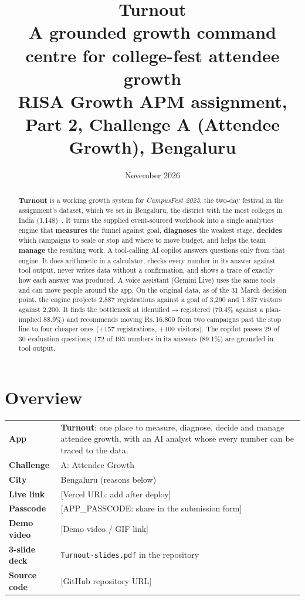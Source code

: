 \documentclass[11pt,a4paper]{article}
\title{\vspace{-1.2cm}\textbf{Turnout}\\[4pt]
\large A grounded growth command centre for college-fest attendee growth\\[2pt]
\normalsize RISA Growth APM assignment, Part 2, Challenge A (Attendee Growth), Bengaluru}
\author{\AuthorName}
\date{November 2026}
\newcommand{\LiveURL}{[Vercel URL: add after deploy]}
\newcommand{\Passcode}{[APP\_PASSCODE: share in the submission form]}
\newcommand{\RepoURL}{[GitHub repository URL]}
\newcommand{\VideoURL}{[Demo video / GIF link]}
\newcommand{\SlidesURL}{\texttt{Turnout-slides.pdf} in the repository}
\newcommand{\rs}{Rs.\,}
\begin{document}
\maketitle
\thispagestyle{fancy}

\begin{abstract}
\noindent \textbf{Turnout} is a working growth system for \emph{CampusFest 2025}, the two-day festival in the assignment's dataset, which we set in Bengaluru, the district with the most colleges in India (1,148)~\cite{aishe2024}. It turns the supplied event-sourced workbook into a single analytics engine that \textbf{measures} the funnel against goal, \textbf{diagnoses} the weakest stage, \textbf{decides} which campaigns to scale or stop and where to move budget, and helps the team \textbf{manage} the resulting work. A tool-calling AI copilot answers questions only from that engine. It does arithmetic in a calculator, checks every number in its answer against tool output, never writes data without a confirmation, and shows a trace of exactly how each answer was produced. A voice assistant (Gemini Live) uses the same tools and can move people around the app.
On the original data, as of the 31 March decision point, the engine projects 2,887 registrations against a goal of 3,200 and 1,837 visitors against 2,200. It finds the bottleneck at identified$\to$registered (70.4\% against a plan-implied 88.9\%) and recommends moving \rs16,800 from two campaigns past the stop line to four cheaper ones (+157 registrations, +100 visitors). The copilot passes 29 of 30 evaluation questions; 172 of 193 numbers in its answers (89.1\%) are grounded in tool output.
\end{abstract}

\tableofcontents
\newpage

\section{Overview}

\begin{tabularx}{\linewidth}{@{}lL@{}}
\toprule
\textbf{App} & \textbf{Turnout}: one place to measure, diagnose, decide and manage attendee growth, with an AI analyst whose every number can be traced to the data. \\
\textbf{Challenge} & A: Attendee Growth~\cite{risa2025assignment} \\
\textbf{City} & Bengaluru (reasons below) \\
\textbf{Live link} & \LiveURL \\
\textbf{Passcode} & \Passcode \\
\textbf{Demo video} & \VideoURL \\
\textbf{3-slide deck} & \SlidesURL \\
\textbf{Source code} & \RepoURL \\
\bottomrule
\end{tabularx}
\end{document}
